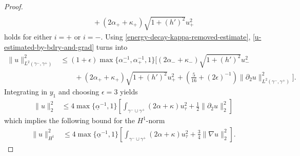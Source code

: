 \documentclass{article}
\theoremstyle{definition}
\theoremstyle{definition}
\begin{document}
\begin{proof}
\begin{equation}
\begin{aligned}
        \\
        &\qquad+ (2\alpha_++\kappa_+)\sqrt{1+(h')^2}u_+^2
    \end{aligned}
\end{equation}
holds for either $i=+$ or $i=-$. Using \eqref{energy-decay-kappa-removed-estimate}, \eqref{u-estimated-by-bdry-and-grad} turns into
\begin{align*}
    \|u\|_{L^2(\gamma^-,\gamma^+)}^2
    &\leq (1+\epsilon) \max\lbrace \alpha_-^{-1}, \alpha_+^{-1}, 1 \rbrace \bigg[(2\alpha_-+\kappa_-)\sqrt{1+(h')^2}u_-^2 
    \\
    &\qquad +(2\alpha_++\kappa_+)\sqrt{1+(h')^2}u_+^2 +\left(\frac{5}{16}+(2\epsilon)^{-1}\right) \|\partial_2 u\|_{L^2(\gamma^-,\gamma^+)}^2\bigg].
\end{align*}
Integrating in $y_1$ and choosing $\epsilon=3$ yields
\begin{align*}
    \|u\|_2^2 &\leq 4 \max\lbrace \underline{\alpha}^{-1}, 1 \rbrace \left[ \int_{\gamma^-\cup\gamma^+} (2\alpha+\kappa) u_\tau^2 + \frac{1}{2}\|\partial_2 u\|_2^2\right]
\end{align*}
which implies the following bound for the $H^1$-norm
\begin{align*}
    \|u\|_{H^1}^2 &\leq 4 \max\lbrace \underline{\alpha}^{-1}, 1 \rbrace \left[ \int_{\gamma^-\cup\gamma^+} (2\alpha+\kappa) u_\tau^2 + \frac{3}{4} \|\nabla u\|_2^2\right].
\end{align*}


\end{proof}
\end{document}
